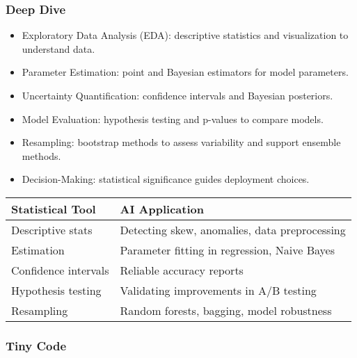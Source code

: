 \documentclass[
  letterpaper,
  DIV=11,
  numbers=noendperiod]{scrreprt}
\providecommand{\tightlist}{%
  \setlength{\itemsep}{0pt}\setlength{\parskip}{0pt}}
\begin{document}
\subsubsection{Deep Dive}\label{deep-dive-139}

\begin{itemize}
\tightlist
\item
  Exploratory Data Analysis (EDA): descriptive statistics and
  visualization to understand data.
\item
  Parameter Estimation: point and Bayesian estimators for model
  parameters.
\item
  Uncertainty Quantification: confidence intervals and Bayesian
  posteriors.
\item
  Model Evaluation: hypothesis testing and p-values to compare models.
\item
  Resampling: bootstrap methods to assess variability and support
  ensemble methods.
\item
  Decision-Making: statistical significance guides deployment choices.
\end{itemize}

\begin{longtable}[]{@{}ll@{}}
\toprule\noalign{}
Statistical Tool & AI Application \\
\midrule\noalign{}
\endhead
\bottomrule\noalign{}
\endlastfoot
Descriptive stats & Detecting skew, anomalies, data preprocessing \\
Estimation & Parameter fitting in regression, Naive Bayes \\
Confidence intervals & Reliable accuracy reports \\
Hypothesis testing & Validating improvements in A/B testing \\
Resampling & Random forests, bagging, model robustness \\
\end{longtable}

\subsubsection{Tiny Code}\label{tiny-code-139}
\end{document}
